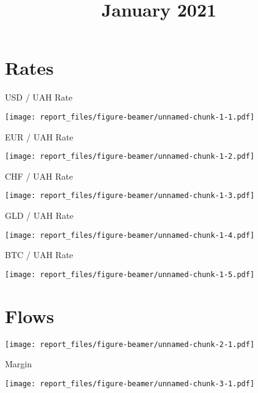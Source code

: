 \documentclass[ignorenonframetext,]{beamer}
\title{January 2021}
\author{}
\date{\vspace{-2.5em}}
\begin{document}
\frame{\titlepage}

\begin{frame}
\tableofcontents[hideallsubsections]
\end{frame}
\hypertarget{rates}{%
\section{Rates}\label{rates}}

\begin{frame}{USD / UAH Rate}
\protect\hypertarget{usd-uah-rate}{}

\texttt{[image: report\_files/figure-beamer/unnamed-chunk-1-1.pdf]}

\end{frame}

\begin{frame}{EUR / UAH Rate}
\protect\hypertarget{eur-uah-rate}{}

\texttt{[image: report\_files/figure-beamer/unnamed-chunk-1-2.pdf]}

\end{frame}

\begin{frame}{CHF / UAH Rate}
\protect\hypertarget{chf-uah-rate}{}

\texttt{[image: report\_files/figure-beamer/unnamed-chunk-1-3.pdf]}

\end{frame}

\begin{frame}{GLD / UAH Rate}
\protect\hypertarget{gld-uah-rate}{}

\texttt{[image: report\_files/figure-beamer/unnamed-chunk-1-4.pdf]}

\end{frame}

\begin{frame}{BTC / UAH Rate}
\protect\hypertarget{btc-uah-rate}{}

\texttt{[image: report\_files/figure-beamer/unnamed-chunk-1-5.pdf]}

\end{frame}

\hypertarget{flows}{%
\section{Flows}\label{flows}}

\texttt{[image: report\_files/figure-beamer/unnamed-chunk-2-1.pdf]}

\begin{frame}{Margin}
\protect\hypertarget{margin}{}

\texttt{[image: report\_files/figure-beamer/unnamed-chunk-3-1.pdf]}

\end{frame}
\end{document}
